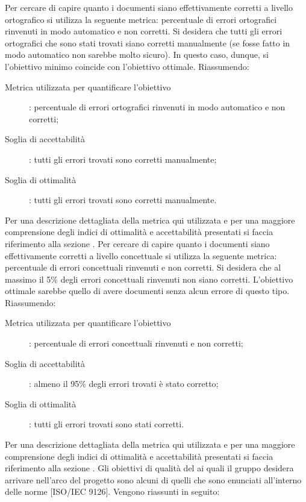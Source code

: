 					Per cercare di capire quanto i documenti siano effettivamente corretti a livello ortografico si utilizza la seguente metrica: percentuale di errori ortografici rinvenuti in modo automatico e non corretti. Si desidera che tutti gli errori ortografici che sono stati trovati siano corretti manualmente (se fosse fatto in modo automatico non sarebbe molto sicuro). In questo caso, dunque, si l'obiettivo minimo coincide con l'obiettivo ottimale. Riassumendo:
					\begin{description}
						\item[Metrica utilizzata per quantificare l'obiettivo]: percentuale di errori ortografici rinvenuti in modo automatico e non corretti;
						\item[Soglia di accettabilità]: tutti gli errori trovati sono corretti manualmente;
						\item[Soglia di ottimalità]: tutti gli errori trovati sono corretti manualmente.
					\end{description}
					Per una descrizione dettagliata della metrica qui utilizzata e per una maggiore comprensione degli indici di ottimalità e accettabilità presentati si faccia riferimento alla sezione .
					Per cercare di capire quanto i documenti siano effettivamente corretti a livello concettuale si utilizza la seguente metrica: percentuale di errori concettuali rinvenuti e non corretti. Si desidera che al massimo il 5\% degli errori concettuali rinvenuti non siano corretti. L'obiettivo ottimale sarebbe quello di avere documenti senza alcun errore di questo tipo. Riassumendo:
					\begin{description}
						\item[Metrica utilizzata per quantificare l'obiettivo]: percentuale di errori concettuali rinvenuti e non corretti;
						\item[Soglia di accettabilità]: almeno il 95\% degli errori trovati è stato corretto;
						\item[Soglia di ottimalità]: tutti gli errori trovati sono stati corretti.
					\end{description}
					Per una descrizione dettagliata della metrica qui utilizzata e per una maggiore comprensione degli indici di ottimalità e accettabilità presentati si faccia riferimento alla sezione .
				Gli obiettivi di qualità del  ai quali il gruppo \groupname{} desidera arrivare nell'arco del progetto sono alcuni di quelli che sono enunciati all'interno delle norme [ISO/IEC 9126]. Vengono riassunti in seguito:
